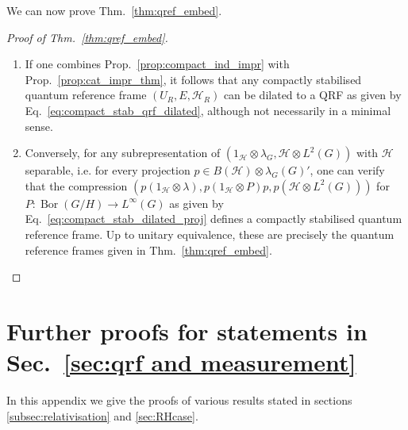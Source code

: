 \documentclass[sn-mathphys-num]{sn-jnl}%
\newcommand{\HH}{\mathcal{H}}
\DeclareMathOperator{\Bor}{Bor}
\numberwithin{equation}{section}
\theoremstyle{thmstyleone}%
\theoremstyle{thmstyletwo}%
\theoremstyle{thmstylethree}%
\begin{document}
    We can now prove Thm.\ \ref{thm:qref_embed}.
    \begin{proof}[Proof of Thm.\ \ref{thm:qref_embed}]
    \begin{enumerate}
        \item If one combines Prop.\ \ref{prop:compact_ind_impr} with Prop.\ \ref{prop:cat_impr_thm}, it follows that any compactly stabilised quantum reference frame $(U_R,E,\HH_R)$ can be dilated to a QRF as given by Eq.\ \eqref{eq:compact_stab_qrf_dilated}, although not necessarily in a minimal sense.
        \item  Conversely, for any subrepresentation of $(1_\HH\otimes\lambda_G,\HH\otimes L^2(G))$ with $\HH$ separable, i.e. for every projection $p\in B(\HH)\otimes \lambda_G(G)'$, one can verify that the compression $(p(1_\HH\otimes \lambda), p(1_\HH\otimes P)p, p(\HH\otimes L^2(G)))$ for $P:\Bor(G/H)\to L^\infty(G)$ as given by Eq.\ \eqref{eq:compact_stab_dilated_proj} defines a compactly stabilised quantum reference frame. Up to unitary equivalence, these are precisely the quantum reference frames given in Thm.\ \ref{thm:qref_embed}.
    \end{enumerate}
    \end{proof}
    
\section{Further proofs for statements in Sec.\ \ref{sec:qrf and measurement}}
\label{appx:proofs}
In this appendix we give the proofs of various results stated in sections \ref{subsec:relativisation} and \ref{sec:RHcase}.
\end{document}
